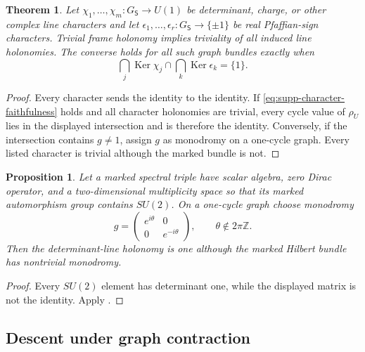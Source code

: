 \documentclass[11pt]{article}
\newtheorem{theorem}{Theorem}[section]
\newtheorem{proposition}[proposition]{Proposition}
\theoremstyle{definition}
\theoremstyle{remark}
\theoremstyle{definition}
\theoremstyle{remark}
\newcommand{\Z}{\mathbb Z}
\newcommand{\Ker}{\operatorname{Ker}}
\begin{document}
\begin{theorem}
\label{thm:character-holonomy-detection}
Let
$\chi_1,\ldots,\chi_m:G_{\mathsf S}\to U(1)$ be determinant, charge, or other
complex line characters and let
$\epsilon_1,\ldots,\epsilon_r:G_{\mathsf S}\to\{\pm1\}$ be real Pfaffian-sign
characters.  Trivial frame holonomy implies triviality of all induced line
holonomies.  The converse holds for all such graph bundles exactly when
\begin{equation}
 {
 \bigcap_j\Ker\chi_j\cap\bigcap_k\Ker\epsilon_k=\{1\}.}
 \label{eq:supp-character-faithfulness}
\end{equation}
\end{theorem}

\begin{proof}
Every character sends the identity to the identity.  If
\eqref{eq:supp-character-faithfulness} holds and all character holonomies are
trivial, every cycle value of $\rho_U$ lies in the displayed intersection and
is therefore the identity.  Conversely, if the intersection contains
$g\ne1$, assign $g$ as monodromy on a one-cycle graph.  Every listed character
is trivial although the marked bundle is not.
\end{proof}

\begin{proposition}
\label{cth:supp-det-no-frame}
Let a marked spectral triple have scalar algebra, zero Dirac operator, and a
two-dimensional multiplicity space so that its marked automorphism group contains
$SU(2)$.  On a one-cycle graph choose monodromy
\begin{equation}
 g=\begin{pmatrix}e^{i\theta}&0\\0&e^{-i\theta}\end{pmatrix},
 \qquad \theta\notin2\pi\Z.
 \label{eq:supp-SU2-monodromy}
\end{equation}
Then the determinant-line holonomy is one although the marked Hilbert bundle
has nontrivial monodromy.
\end{proposition}

\begin{proof}
Every $SU(2)$ element has determinant one, while the displayed matrix is not
the identity.  Apply .
\end{proof}

\subsection{Descent under graph contraction}
\end{document}
